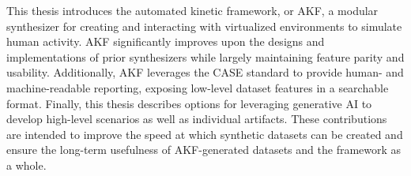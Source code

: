 This thesis introduces the automated kinetic framework, or AKF, a
modular synthesizer for creating and interacting with virtualized
environments to simulate human activity. AKF significantly improves upon
the designs and implementations of prior synthesizers while largely
maintaining feature parity and usability. Additionally, AKF leverages
the CASE standard to provide human- and machine-readable reporting,
exposing low-level dataset features in a searchable format. Finally,
this thesis describes options for leveraging generative AI to develop
high-level scenarios as well as individual artifacts. These
contributions are intended to improve the speed at which synthetic
datasets can be created and ensure the long-term usefulness of
AKF-generated datasets and the framework as a whole.

